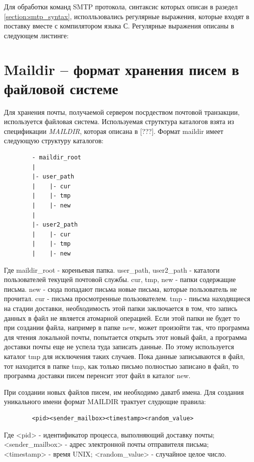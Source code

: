 \documentclass[a4paper,12pt]{report}
\begin{document}
    Для обработки команд SMTP протокола, синтаксис которых описан в разедел \ref{section:smtp_syntax}, исполльзовались регулярные выражения, которые входят в поставку вместе с компилятором языка С. Регулярные выражения описаны в следующем листинге:
    
    
    \section{Maildir -- формат хранения писем в файловой системе}
    Для хранения почты, получаемой сервером посрдеством почтовой транзакции, используется файловая система. Используемая струтктура каталогов взята из спецификации \textit{MAILDIR}, которая описана в [???]. Формат maildir имеет следующую структуру каталогов:
    \begin{verbatim}
        - maildir_root
        |
        |- user_path
        |    |- cur
        |    |- tmp
        |    |- new
        |
        |- user2_path
        |    |- cur
        |    |- tmp
        |    |- new
    \end{verbatim}
    Где maildir\_root - кореньевая папка. user\_path, user2\_path - каталоги пользователей текущей почтовой службы. cur, tmp, new - папки содержащие письма. 
    new - сюда попадают письма новые письма, которые пользователь не прочитал. cur - письма просмотренные пользователем. tmp - пиьсма находящиеся на стадии доставки, необходимость этой папки заключается в том, что запись данных в файл не является атомарной операцией. Если этой папки не будет то при создании файла, например в папке new, может произойти так, что программа для чтения локальной почты, попытается открыть этот новый файл, а программа доставки почты еще не успела туда записать данные. По этому используется каталог tmp для исключения таких случаев. Пока данные записываются в файл, тот находится в папке tmp, как только письмо полностью записано в файл, то программа доставки писем перенсит этот файл в каталог new.
    
    При создании новых файлов писем, им необходимо даватб имена. Для создания уникального имени формат MAILDIR трактует слудющие правила:
    \begin{verbatim}
        <pid><sender_mailbox><timestamp><random_value>
    \end{verbatim}
    Где <pid> - идентификатор процесса, выполняющий доставку почты; <sender\_mailbox> - адрес электронной почты отправителя письма;  <timestamp> - время UNIX; <random\_value> - случайное целое число.
    
\end{document}

